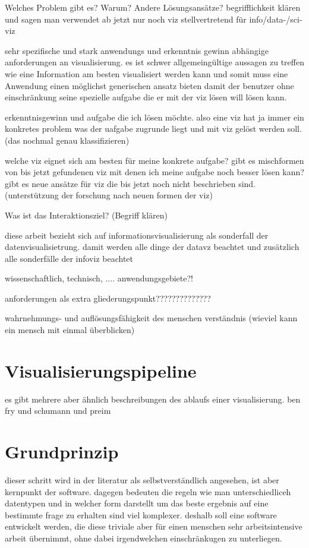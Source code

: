 \documentclass[a4paper, 12pt, DIVcalc, onepage, pdftex, headsepline, footsepline]{scrreprt}
\begin{document}
Welches Problem gibt es?
Warum?
Andere Lösungsansätze?
begrifflichkeit klären und sagen man verwendet ab jetzt nur noch viz stellvertretend für info/data-/sci-viz

sehr spezifische und stark anwendungs und erkenntnis gewinn abhängige anforderungen an visualisierung. 
es ist schwer allgemeingültige aussagen zu treffen wie eine Information am besten visualisiert werden kann und somit muss eine Anwendung einen möglichst generischen ansatz bieten damit der benutzer ohne einschränkung seine spezielle aufgabe die er mit der viz lösen will lösen kann.

erkenntnisgewinn und aufgabe die ich lösen möchte. also eine viz hat ja immer ein konkretes problem was der uafgabe zugrunde liegt und mit viz gelöst werden soll. (das nochmal genau klassifizieren)

welche viz eignet sich am besten für meine konkrete aufgabe?
gibt es mischformen von bis jetzt gefundenen viz mit denen ich meine aufgabe noch besser lösen kann?
gibt es neue ansätze für viz die bis jetzt noch nicht beschrieben sind. (unterstützung der forschung nach neuen formen der viz)

Was ist das Interaktionsziel? (Begriff klären)

diese arbeit bezieht sich auf informationsvisualisierung als sonderfall der datenvisualisietrung. damit werden alle dinge der datavz beachtet und zusätzlich alle sonderfälle der infoviz beachtet

wissenschaftlich, technisch, .... anwendungsgebiete?!

anforderungen als extra gliederungspunkt??????????????

wahrnehmungs- und auflösungsfähigkeit des menschen
verständnis (wieviel kann ein mensch mit einmal überblicken)

\section{Visualisierungspipeline}
\label{sec:Pipeline}
es gibt mehrere aber ähnlich beschreibungen des ablaufs einer visualisierung.
ben fry und schumann  und preim
\section{Grundprinzip}
\label{sec:Grundprinzip}
dieser schritt wird in der literatur als selbstverständlich angesehen, ist aber kernpunkt der software. dagegen bedeuten die regeln wie man unterschiedliceh datentypen und in welcher form darstellt um das beste ergebnis auf eine bestimmte frage zu erhalten sind viel komplexer.
deshalb soll eine software entwickelt werden, die diese triviale aber für einen menschen sehr arbeitsintensive arbeit übernimmt, ohne dabei irgendwelchen einschränkugen zu unterliegen.
\end{document}
